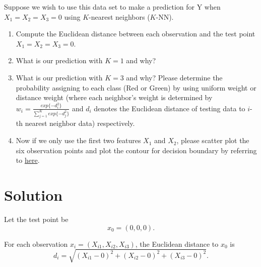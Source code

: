 \documentclass[11pt]{article}
\begin{document}
\noindent Suppose we wish to use this data set to make a prediction for Y when $X_1=X_2=X_3=0$ using $K$-nearest neighbors ($K$-NN).
\begin{enumerate}
	\item Compute the Euclidean distance between each observation and the test point $X_1=X_2=X_3=0$.
	\item What is our prediction with $K=1$ and why? 
	\item What is our prediction with $K=3$ and why? Please determine the probability assigning to each class (Red or Green) by using uniform weight or distance weight (where each neighbor's weight is determined by $w_i=\frac{exp\{-d_i^2\}}{\sum_{j=1}^{K}exp\{-d_j^2\}}$ and $d_i$ denotes the Euclidean distance of testing data to $i$-th nearest neighbor data) respectively.
	\item Now if we only use the first two features $X_1$ and $X_2$, please scatter plot the six observation points and plot the contour for decision boundary by referring to \href{https://stackoverflow.com/questions/45075638/graph-k-nn-decision-boundaries-in-matplotlib}{here}.
\end{enumerate} 

\section*{Solution}

Let the test point be
\[
x_0=(0,0,0).
\]

For each observation \(x_i=(X_{i1},X_{i2},X_{i3})\), the Euclidean distance to \(x_0\) is
\[
d_i=\sqrt{(X_{i1}-0)^2+(X_{i2}-0)^2+(X_{i3}-0)^2}.
\]
\end{document}
